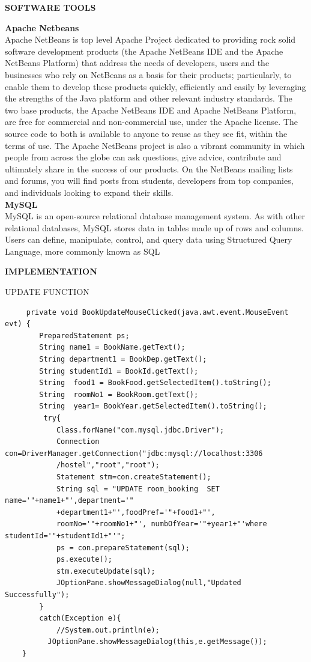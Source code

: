 \documentclass[a4paper,12pt]{report}
\begin{document}
\begin{flushleft}
		\textbf{SOFTWARE TOOLS} 
\end{flushleft} 
\textbf{Apache Netbeans}
\\
Apache NetBeans is top level Apache Project dedicated to providing rock solid software development products (the Apache NetBeans IDE and the Apache NetBeans Platform) that address the needs of developers, users and the businesses who rely on NetBeans as a basis for their products; particularly, to enable them to develop these products quickly, efficiently and easily by leveraging the strengths of the Java platform and other relevant industry standards.
The two base products, the Apache NetBeans IDE and Apache NetBeans Platform, are free for commercial and non-commercial use, under the Apache license. The source code to both is available to anyone to reuse as they see fit, within the terms of use.
The Apache NetBeans project is also a vibrant community in which people from across the globe can ask questions, give advice, contribute and ultimately share in the success of our products. On the NetBeans mailing lists and forums, you will find posts from students, developers from top companies, and individuals looking to expand their skills.
\\
\textbf{MySQL}\\
MySQL is an open-source relational database management system. As with other relational databases, MySQL stores data in tables made up of rows and columns. Users can define, manipulate, control, and query data using Structured Query Language, more commonly known as SQL
\begin{flushleft}
		\textbf{IMPLEMENTATION} 
\end{flushleft} 
UPDATE FUNCTION

\begin{verbatim}
     private void BookUpdateMouseClicked(java.awt.event.MouseEvent evt) { 
        PreparedStatement ps;
        String name1 = BookName.getText();
        String department1 = BookDep.getText();
        String studentId1 = BookId.getText();
        String  food1 = BookFood.getSelectedItem().toString();
        String  roomNo1 = BookRoom.getText();
        String  year1= BookYear.getSelectedItem().toString();
         try{
            Class.forName("com.mysql.jdbc.Driver");
            Connection con=DriverManager.getConnection("jdbc:mysql://localhost:3306
            /hostel","root","root");
            Statement stm=con.createStatement();
            String sql = "UPDATE room_booking  SET name='"+name1+"',department='"
            +department1+"',foodPref='"+food1+"',
            roomNo='"+roomNo1+"', numbOfYear='"+year1+"'where studentId='"+studentId1+"'";
            ps = con.prepareStatement(sql);
            ps.execute();
            stm.executeUpdate(sql);
            JOptionPane.showMessageDialog(null,"Updated Successfully");
        }
        catch(Exception e){
            //System.out.println(e);
          JOptionPane.showMessageDialog(this,e.getMessage());
    }                     
\end{verbatim}
\end{document}

